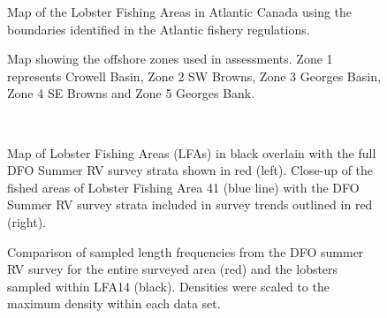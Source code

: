 \documentclass[11pt]{article}
\newcommand{\e}{/SpinDr/backup/bio_data/bio.lobster/figures/} %
\begin{document}
\begin{landscape}
\begin{figure}
\centering
    \caption{Map of the Lobster Fishing Areas in Atlantic Canada using the boundaries identified in the Atlantic fishery regulations.}

\end{figure}
\end{landscape}


\begin{figure}
\centering
    \caption{Map showing the offshore zones used in assessments. Zone 1 represents Crowell Basin, Zone 2 SW Browns, Zone 3 Georges Basin, Zone 4 SE Browns and Zone 5 Georges Bank. 
}

\end{figure}

\begin{landscape}

\begin{figure}
\centering
{}\\
\caption{ Map of Lobster Fishing Areas (LFAs) in black overlain with the full DFO Summer RV survey strata shown in red (left). Close-up of the fished areas of Lobster Fishing Area 41 (blue line) with the DFO Summer RV survey strata included in survey trends outlined in red (right).}
\end{figure}

\end{landscape}

\begin{figure}
\centering
    \caption{Comparison of sampled length frequencies from the DFO summer RV survey for the entire surveyed area (red) and the lobsters sampled within LFA14 (black). Densities were scaled to the maximum density within each data set.}
\end{figure}
\end{document}
